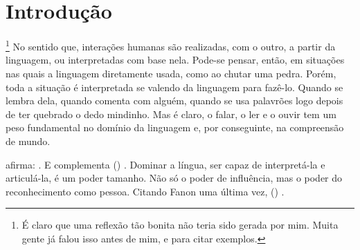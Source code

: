 \chapter{Introdução}
\label{cha:introducao}
 \cite{oliveira2019servico}
\footnote{É claro que uma reflexão tão bonita não teria sido gerada por mim. Muita gente já falou isso antes de mim,  e  para citar exemplos.}
No sentido que, interações humanas são realizadas, com o outro, a partir da linguagem, ou interpretadas com base nela. 
Pode-se pensar, então, em situações nas quais a linguagem  diretamente usada, como ao chutar uma pedra.
Porém, toda a situação é interpretada se valendo da linguagem para fazê-lo. 
Quando se lembra dela, quando comenta com alguém, quando se  usa palavrões logo depois de ter quebrado o dedo mindinho. Mas é claro, o falar, o ler e o ouvir tem um peso fundamental no domínio da linguagem e, por conseguinte, na compreensão de mundo.

 afirma: . E complementa (\textit{}) . Dominar a língua, ser capaz de interpretá-la e articulá-la, é um poder tamanho. Não só o poder de influência, mas o poder do reconhecimento como pessoa. Citando Fanon uma última vez, (\textit{}) .

